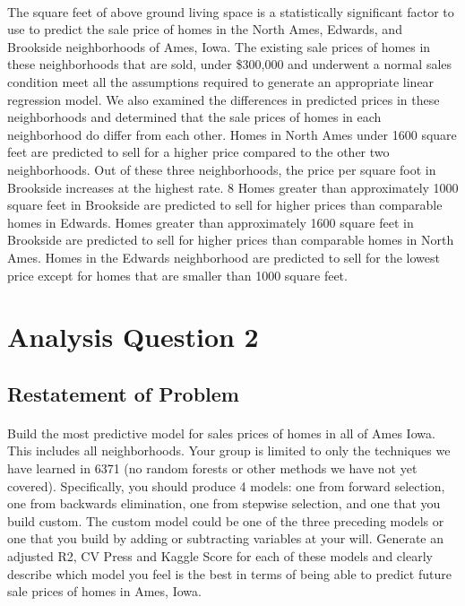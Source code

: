 \documentclass[11pt]{scrartcl} %
\begin{document}
\paragraph{} The square feet of above ground living space is a statistically significant factor to use to predict the sale price of homes in the North Ames, Edwards, and Brookside neighborhoods of Ames, Iowa. The existing sale prices of homes in these neighborhoods that are sold, under \$300,000 and underwent a normal sales condition meet all the assumptions required to generate an appropriate linear regression model. We also examined the differences in predicted
prices in these neighborhoods and determined that the sale prices of homes in each neighborhood do differ from each other. Homes in North Ames under 1600 square feet are predicted to sell for a higher price compared to the other two neighborhoods. Out of these three neighborhoods, the price per square foot in Brookside increases at the highest rate.  8 Homes greater than approximately 1000 square feet in Brookside are predicted to sell for higher prices than comparable homes in Edwards. Homes greater than approximately 1600 square feet in Brookside are predicted to sell for higher prices than comparable homes in North Ames. Homes in the Edwards neighborhood are predicted to sell for the lowest price except for homes that are smaller than 1000 square feet.


\section{Analysis Question 2}

\subsection{Restatement of Problem}
\paragraph{} Build the most predictive model for sales prices of homes in all of Ames Iowa.  This includes all neighborhoods. Your group is limited to only the techniques we have learned in 6371 (no random forests or other methods we have not yet covered).  Specifically, you should produce 4 models: one from forward selection, one from backwards elimination, one from stepwise selection, and one that you build custom.  The custom model could be one of the three preceding models or one that you build by adding or subtracting variables at your will.  Generate an adjusted R2, CV Press and Kaggle Score for each of these models and clearly describe which model you feel is the best in terms of being able to predict future sale prices of homes in Ames, Iowa. 
\end{document}

